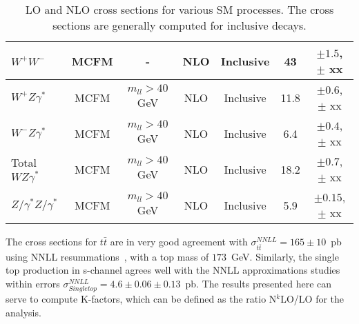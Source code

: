 \begin{table}[hbt]
\begin{center}
\begin{tabular}{|l|c|c|c|c|c|c|}
$W^+W^-$ & MCFM & - & NLO & Inclusive & 43 & $\pm 1.5$, $\pm$ xx \\ \hline
$W^+Z\gamma^*$ & MCFM & $m_{ll} > 40$ GeV & NLO & Inclusive & 11.8 & $\pm 0.6$, $\pm$ xx \\ \hline
$W^-Z\gamma^*$ & MCFM & $m_{ll} > 40$ GeV & NLO & Inclusive & 6.4 & $\pm 0.4$, $\pm$ xx \\ \hline
Total $WZ\gamma^*$ & MCFM & $m_{ll} > 40$ GeV & NLO & Inclusive & 18.2 & $\pm 0.7$, $\pm$ xx \\ \hline
$Z/\gamma^*Z/\gamma^*$ & MCFM & $m_{ll} > 40$ GeV & NLO & Inclusive & 5.9 & $\pm 0.15$, $\pm$ xx \\ \hline
\end{tabular} 
\caption{LO and NLO cross sections for various SM processes. The cross sections are generally
computed for inclusive decays. \label{tab:nlo}}
\end{center}
\end{table}

The cross sections for $t\bar{t}$ are in very good agreement with $\sigma^{NNLL}_{t\bar{t}} = 165 \pm 10$~pb using NNLL 
resummations~\cite{nnllttbar}, with a top mass of $173$~GeV. Similarly, the single top production in s-channel 
agrees well with the NNLL approximations studies~\cite{nnllschannel} within errors $\sigma^{NNLL}_{Single top} = 4.6 \pm 0.06 
\pm 0.13$~pb. The results presented here can serve to compute K-factors, which can be 
defined as the ratio N$^k$LO/LO for the analysis. 
